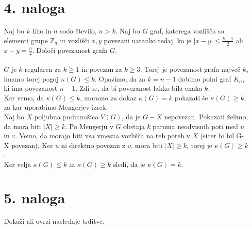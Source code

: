 \documentclass[a4paper,11pt]{article}
\begin{document}
\newpage
\section*{4. naloga}
Naj bo $k$ liho in $n$ sodo število, $n > k$. Naj bo $G$ graf, katerega vozlišča so elementi grupe $\mathbb{Z}_n$ in vozlišči $x, y$ povezani natanko tedaj, ko je $|x - y| \leq \frac{k - 1}{2}$ ali $x - y = \frac{n}{2}$. Določi povezanost grafa $G$.
\\
\\
$G$ je $k$-regularen za $k \geq 1$ in povezan za $k \geq 3$. Torej je povezanost grafa največ $k$, imamo torej pogoj $\kappa (G) \leq k$.
Opazimo, da za $k = n - 1$ dobimo polni graf $K_n$, ki ima povezanost $n - 1$. Zdi se, da bi povezanost lahko bila enaka $k$.
\\
Ker vemo, da $\kappa (G) \leq k$, moramo za dokaz $\kappa (G) = k$ pokazati še $\kappa (G) \geq k$, za kar uporabimo Mengerjev izrek.
\\
Naj bo $X$ poljubna podmnožica $V(G)$, da je $G - X$ nepovezan. Pokazati želimo, da mora biti $|X| \geq k$.
Po Mengerju v $G$ obstaja $k$ paroma neodvisnih poti med $u$ in $v$. Vemo, da morajo biti vsa vmesna vozlišča na teh poteh v $X$ (sicer bi bil G-X povezan).
Ker $u$ ni direktno povezan z $v$, mora biti $|X| \geq k$, torej je $\kappa(G) \geq k$.
\\
Ker velja $\kappa (G) \leq k$ in $\kappa (G) \geq k$ sledi, da je $\kappa (G) = k$.

\newpage
\section*{5. naloga}
Dokaži ali ovrzi naslednje trditve.
\end{document}
